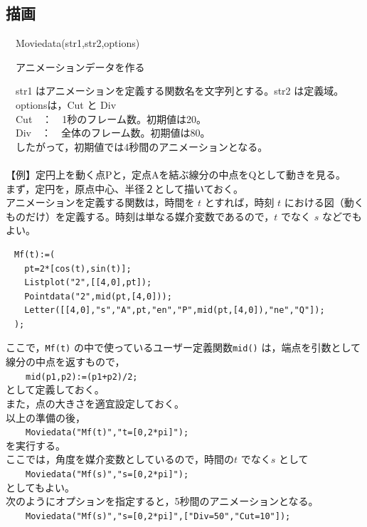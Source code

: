 \documentclass[papersize,a4paper,12pt,uplatex]{jsarticle}
\begin{document}
\subsection{描画}
\begin{description}

\hypertarget{moviedata}{}
\item[関数]　Moviedata(str1,str2,options)
\item[機能]　アニメーションデータを作る
\item[説明]　str1 はアニメーションを定義する関数名を文字列とする。str2 は定義域。\\
　optionsは，Cut と Div \\
　Cut　：　1秒のフレーム数。初期値は20。\\
　Div　：　全体のフレーム数。初期値は80。\\
　したがって，初期値では4秒間のアニメーションとなる。\\
　\\
【例】定円上を動く点Pと，定点Aを結ぶ線分の中点をQとして動きを見る。\\
まず，定円を，原点中心、半径２として描いておく。\\
アニメーションを定義する関数は，時間を $t$ とすれば，時刻 $t$ における図（動くものだけ）を定義する。時刻は単なる媒介変数であるので，$t$ でなく $s$ などでもよい。
\begin{verbatim}
　Mf(t):=(
　  pt=2*[cos(t),sin(t)];
　  Listplot("2",[[4,0],pt]);
　  Pointdata("2",mid(pt,[4,0]));
　  Letter([[4,0],"s","A",pt,"en","P",mid(pt,[4,0]),"ne","Q"]);
　);
\end{verbatim}
ここで，\verb|Mf(t)| の中で使っているユーザー定義関数\verb|mid()| は，端点を引数として線分の中点を返すもので，\\
　　\verb|mid(p1,p2):=(p1+p2)/2;|\\
として定義しておく。\\
また，点の大きさを適宜設定しておく。\\
以上の準備の後，\\
　　\verb|Moviedata("Mf(t)","t=[0,2*pi]");|\\
を実行する。\\
ここでは，角度を媒介変数としているので，時間の$t$ でなく$s$ として\\
　　\verb|Moviedata("Mf(s)","s=[0,2*pi]");|\\
としてもよい。\\
次のようにオプションを指定すると，5秒間のアニメーションとなる。\\
　　\verb|Moviedata("Mf(s)","s=[0,2*pi]",["Div=50","Cut=10"]);|\\

\end{description}
\end{document}

